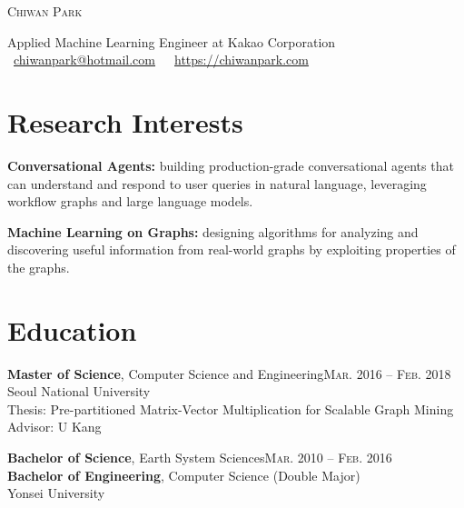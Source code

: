 \documentclass[11pt,a4paper]{article}
\makeatletter
\def\myname{Chiwan Park}
\def\myemail{chiwanpark@hotmail.com}
\def\myhomepage{https://chiwanpark.com}
\renewenvironment{itemize}{
  \begin{list}{}{
    \setlength{\leftmargin}{1em}
    \setlength{\itemsep}{0.25em}
    \setlength{\parskip}{0pt}
    \setlength{\parsep}{0.25em}
  }
}{
  \end{list}
}
\makeatother
\begin{document}
\begin{minipage}[t]{0.375\textwidth}
    \vspace{0pt}
    \Huge
    \textsc{\myname}
\end{minipage}
\hfill
\begin{minipage}[t]{0.6\textwidth}
  \vspace{0pt}
  Applied Machine Learning Engineer at Kakao Corporation\\
  {\scriptsize{}}\ \href{mailto:\myemail}{\myemail}\ \ {\scriptsize{}}\ \href{\myhomepage}{\myhomepage}
\end{minipage}

\section*{Research Interests}
\begin{itemize}
  \item \textbf{Conversational Agents:} building production-grade conversational agents that can understand and respond to user queries in natural language, leveraging workflow graphs and large language models.
  \item \textbf{Machine Learning on Graphs:} designing algorithms for analyzing and discovering useful information from real-world graphs by exploiting properties of the graphs.
\end{itemize}

\section*{Education}
\begin{itemize}
  \item \textbf{Master of Science}, Computer Science and Engineering\hfill\textsc{Mar. 2016 -- Feb. 2018}\\
        Seoul National University\\
        Thesis: Pre-partitioned Matrix-Vector Multiplication for Scalable Graph Mining\\
        Advisor: U Kang
  \item \textbf{Bachelor of Science}, Earth System Sciences\hfill\textsc{Mar. 2010 -- Feb. 2016}\\
        \textbf{Bachelor of Engineering}, Computer Science (Double Major)\\
        Yonsei University
\end{itemize}
\end{document}
